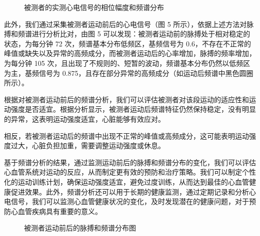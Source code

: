 \documentclass[a4paper,12pt]{article}
\begin{document}
\begin{figure}[H]
    \centering
    \caption{被测者的实测心电信号的相位幅度和频谱分布}
\end{figure}

此外，我们通过采集被测者运动前后的心电信号（图 5 所示），依据上述方法对脉搏和频谱进行分析比对，由图 5 可以发现：被测者运动前的脉搏处于相对稳定的状态，为每分钟 72 次，频谱基本分布低频区，基频信号为 0.6，不存在不正常的峰值或缺失以及异常的高频成分，而被测者运动后的心率增加，脉搏的频率增加，为每分钟 105 次，且出现了不规则的、短暂的波动，频谱基本分布仍然以低频区为主，基频信号为 0.875，且存在部分异常的高频成分（如运动后频谱中黑色圆圈所示）。

根据对被测者运动前后的频谱分析，我们可以评估被测者对该段运动的适应性和运动强度是否适宜。根据分析显示，被测者运动后频谱特征仍然保持稳定，没有明显的异常，这表明运动强度适宜，心脏能够有效应对。

相反，若被测者运动后的频谱中出现不正常的峰值或高频成分，这可能表明运动强度过大，心脏负担加重，需要调整运动强度或休息。

基于频谱分析的结果，通过监测运动前后的脉搏和频谱分布的变化，我们可以评估心血管系统对运动的反应，从而制定更有效的预防和治疗策略。我们可以制定个性化的运动训练计划，确保运动强度适宜，避免过度训练，从而达到最佳的心血管健康促进效果。此外，频谱分析还可以用于长期的健康监测，通过定期记录和分析心电信号，我们可以监测心血管健康状况的变化，及时发现潜在的健康问题，对于预防心血管疾病具有重要的意义。

\begin{figure}[H]
    \centering
    \caption{被测者运动前后的脉搏和频谱分布图}
\end{figure}
\end{document}
